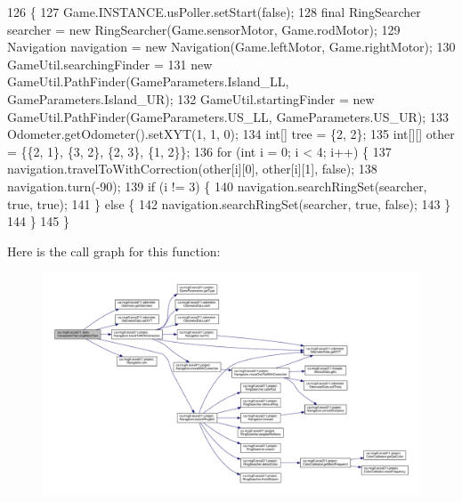 \begin{DoxyCode}
126                                                                \{
127     Game.INSTANCE.usPoller.setStart(\textcolor{keyword}{false});
128     \textcolor{keyword}{final} RingSearcher searcher = \textcolor{keyword}{new} RingSearcher(Game.sensorMotor, Game.rodMotor);
129     Navigation navigation = \textcolor{keyword}{new} Navigation(Game.leftMotor, Game.rightMotor);
130     GameUtil.searchingFinder =
131         \textcolor{keyword}{new} GameUtil.PathFinder(GameParameters.Island\_LL, GameParameters.Island\_UR);
132     GameUtil.startingFinder = \textcolor{keyword}{new} GameUtil.PathFinder(GameParameters.US\_LL, GameParameters.US\_UR);
133     Odometer.getOdometer().setXYT(1, 1, 0);
134     \textcolor{keywordtype}{int}[] tree = \{2, 2\};
135     \textcolor{keywordtype}{int}[][] other = \{\{2, 1\}, \{3, 2\}, \{2, 3\}, \{1, 2\}\};
136     \textcolor{keywordflow}{for} (\textcolor{keywordtype}{int} i = 0; i < 4; i++) \{
137       navigation.travelToWithCorrection(other[i][0], other[i][1], \textcolor{keyword}{false});
138       navigation.turn(-90);
139       \textcolor{keywordflow}{if} (i != 3) \{
140         navigation.searchRingSet(searcher, \textcolor{keyword}{true}, \textcolor{keyword}{true});
141       \} \textcolor{keywordflow}{else} \{
142         navigation.searchRingSet(searcher, \textcolor{keyword}{true}, \textcolor{keyword}{false});
143       \}
144     \}
145   \}
\end{DoxyCode}
Here is the call graph for this function\+:
\nopagebreak
\begin{figure}[H]
\begin{center}
\leavevmode
\includegraphics[width=350pt]{enumca_1_1mcgill_1_1ecse211_1_1tests_1_1_component_test_a1ecca45b47067d825683cf46dcf22b62_cgraph}
\end{center}
\end{figure}
